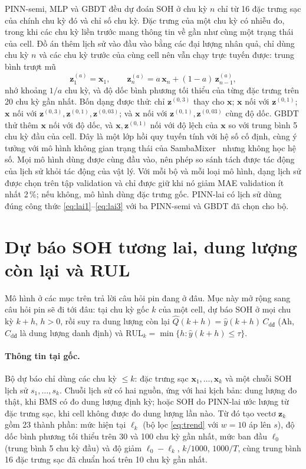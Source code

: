 \documentclass[12pt,a4paper,oneside]{report}
\theoremstyle{plain}
\theoremstyle{definition}
\begin{document}
PINN-semi, MLP và GBDT đều dự đoán SOH ở chu kỳ $n$ chỉ từ 16 đặc trưng sạc của chính chu kỳ đó và chỉ số chu kỳ.
Đặc trưng của một chu kỳ có nhiễu đo, trong khi các chu kỳ liền trước mang thông tin về gần như cùng một trạng thái của
cell. Đồ án thêm lịch sử vào đầu vào bằng các đại lượng nhân quả, chỉ dùng chu kỳ $n$ và các chu kỳ trước của cùng
cell nên vẫn chạy trực tuyến được: trung bình trượt mũ
\begin{equation}\label{eq:ema}
\mathbf{z}^{(a)}_1 = \mathbf{x}_1, \qquad \mathbf{z}^{(a)}_n = a\,\mathbf{x}_n + (1-a)\,\mathbf{z}^{(a)}_{n-1},
\end{equation}
nhớ khoảng $1/a$ chu kỳ, và độ dốc bình phương tối thiểu của từng đặc trưng trên 20 chu kỳ gần nhất. Bốn dạng được
thử: chỉ $\mathbf{z}^{(0{,}3)}$ thay cho $\mathbf{x}$; $\mathbf{x}$ nối với $\mathbf{z}^{(0{,}1)}$; $\mathbf{x}$ nối
với $\mathbf{z}^{(0{,}3)}, \mathbf{z}^{(0{,}1)}, \mathbf{z}^{(0{,}03)}$; và $\mathbf{x}$ nối với $\mathbf{z}^{(0{,}1)},
\mathbf{z}^{(0{,}03)}$ cùng độ dốc. GBDT thử thêm $\mathbf{x}$ nối với độ dốc, và $\mathbf{x}, \mathbf{z}^{(0{,}1)}$ nối
với độ lệch của $\mathbf{x}$ so với trung bình 5 chu kỳ đầu của cell. Đây là một lớp hồi quy tuyến tính với hệ số cố định, cùng ý tưởng với mô hình không
gian trạng thái của SambaMixer~\cite{olalde2024samba} nhưng không học hệ số. Mọi mô hình dùng được cùng đầu vào, nên
phép so sánh tách được tác động của lịch sử khỏi tác động của vật lý. Với mỗi bộ và mỗi loại mô hình, dạng lịch sử được
chọn trên tập validation và chỉ được giữ khi nó giảm MAE validation ít nhất 2\,\%; nếu không, mô hình dùng đặc trưng
gốc. PINN-lai có lịch sử dùng đúng công thức \eqref{eq:lai1}--\eqref{eq:lai3} với ba PINN-semi và GBDT đã chọn cho bộ.

\section{Dự báo SOH tương lai, dung lượng còn lại và RUL}\label{sec:forecast_m}

Mô hình ở các mục trên trả lời câu hỏi pin đang ở đâu. Mục này mở rộng sang câu hỏi pin sẽ đi tới đâu: tại chu kỳ
gốc $k$ của một cell, dự báo SOH ở mọi chu kỳ $k + h$, $h > 0$, rồi suy ra dung lượng còn lại
$\hat Q(k+h) = \hat y(k+h)\,C_\text{dđ}$ (Ah, $C_\text{dđ}$ là dung lượng danh định) và
$\text{RUL}_k = \min\{h : \hat y(k+h) \le \tau\}$.

\paragraph{Thông tin tại gốc.} Bộ dự báo chỉ dùng các chu kỳ $\le k$: đặc trưng sạc $\mathbf{x}_1, \dots,
\mathbf{x}_k$ và một chuỗi SOH lịch sử $s_1, \dots, s_k$. Chuỗi lịch sử có hai nguồn, ứng với hai kịch bản: dung lượng
đo thật, khi BMS có đo dung lượng định kỳ; hoặc SOH do PINN-lai ước lượng từ đặc trưng sạc, khi cell không được đo
dung lượng lần nào. Từ đó tạo vectơ $\mathbf{z}_k$ gồm 23 thành phần: mức hiện tại $\ell_k$ (bộ lọc
\eqref{eq:trend} với $w = 10$ áp lên $s$), độ dốc bình phương tối thiểu trên 30 và 100 chu kỳ gần nhất, mức ban đầu $\ell_0$ (trung
bình 5 chu kỳ đầu) và độ giảm $\ell_0 - \ell_k$, $k/1000$, $1000/T$, cùng trung bình 16 đặc trưng sạc đã chuẩn hoá
trên 10 chu kỳ gần nhất.
\end{document}
